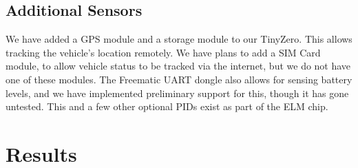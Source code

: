 \documentclass[10pt,letterpaper,unboxed,cm]{article}
\begin{document}
\subsection{Additional Sensors}

We have added a GPS module and a storage module to our TinyZero. This allows tracking the vehicle's location remotely. We have plans to add a SIM Card module, to allow vehicle status to be tracked via the internet, but we do not have one of these modules. The Freematic UART dongle also allows for sensing battery levels, and we have implemented preliminary support for this, though it has gone untested. This and a few other optional PIDs exist as part of the ELM chip.

\section{Results}
\end{document}
